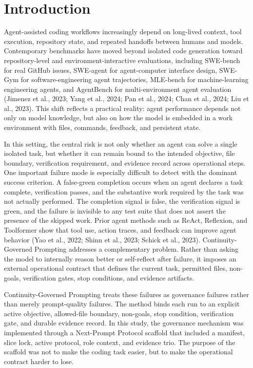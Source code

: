 \documentclass[11pt]{article}
\begin{document}
\section{Introduction}
Agent-assisted coding workflows increasingly depend on long-lived context, tool execution, repository state, and repeated handoffs between humans and models. Contemporary benchmarks have moved beyond isolated code generation toward repository-level and environment-interactive evaluations, including SWE-bench for real GitHub issues, SWE-agent for agent-computer interface design, SWE-Gym for software-engineering agent trajectories, MLE-bench for machine-learning engineering agents, and AgentBench for multi-environment agent evaluation (Jimenez et al., 2023; Yang et al., 2024; Pan et al., 2024; Chan et al., 2024; Liu et al., 2023). This shift reflects a practical reality: agent performance depends not only on model knowledge, but also on how the model is embedded in a work environment with files, commands, feedback, and persistent state.

In this setting, the central risk is not only whether an agent can solve a single isolated task, but whether it can remain bound to the intended objective, file boundary, verification requirement, and evidence record across operational steps. One important failure mode is especially difficult to detect with the dominant success criterion. A false-green completion occurs when an agent declares a task complete, verification passes, and the substantive work required by the task was not actually performed. The completion signal is false, the verification signal is green, and the failure is invisible to any test suite that does not assert the presence of the skipped work. Prior agent methods such as ReAct, Reflexion, and Toolformer show that tool use, action traces, and feedback can improve agent behavior (Yao et al., 2022; Shinn et al., 2023; Schick et al., 2023). Continuity-Governed Prompting addresses a complementary problem. Rather than asking the model to internally reason better or self-reflect after failure, it imposes an external operational contract that defines the current task, permitted files, non-goals, verification gates, stop conditions, and evidence artifacts.

Continuity-Governed Prompting treats these failures as governance failures rather than merely prompt-quality failures. The method binds each run to an explicit active objective, allowed-file boundary, non-goals, stop condition, verification gate, and durable evidence record. In this study, the governance mechanism was implemented through a Next-Prompt Protocol scaffold that included a manifest, slice lock, active protocol, role context, and evidence trio. The purpose of the scaffold was not to make the coding task easier, but to make the operational contract harder to lose.
\end{document}
